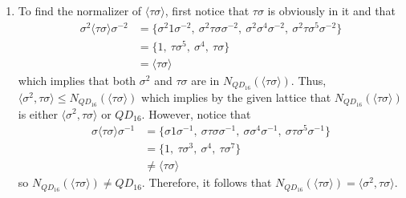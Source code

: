 \begin{solution}
    \begin{enumerate}[label = \textbf{(\alph*)}]
        \item To find the normalizer of $\langle \tau\sigma \rangle$, first notice that $\tau\sigma$ is obviously in it and that
        \begin{align*}
            \sigma^2\langle \tau\sigma \rangle \sigma^{-2} &= \{\sigma^2 1 \sigma^{-2}, \ \sigma^2 \tau\sigma \sigma^{-2}, \ \sigma^2 \sigma^4 \sigma^{-2}, \ \sigma^2 \tau\sigma^5 \sigma^{-2}\} \\
            &= \{1, \ \tau\sigma^5, \ \sigma^4, \ \tau\sigma\} \\
            &= \langle \tau\sigma \rangle
        \end{align*}
        which implies that both $\sigma^2$ and $\tau\sigma$ are in $N_{QD_{16}}(\langle \tau\sigma \rangle)$. Thus, $\langle \sigma^2, \tau\sigma \rangle \leq N_{QD_{16}}(\langle \tau\sigma \rangle)$ which implies by the given lattice that $N_{QD_{16}}(\langle \tau\sigma \rangle)$ is either $\langle \sigma^2, \tau\sigma \rangle$ or $QD_{16}$. However, notice that 
        \begin{align*}
            \sigma\langle \tau\sigma \rangle \sigma^{-1} &= \{\sigma 1 \sigma^{-1}, \ \sigma \tau\sigma \sigma^{-1}, \ \sigma \sigma^4 \sigma^{-1}, \ \sigma \tau\sigma^5 \sigma^{-1}\} \\
            &= \{1, \ \tau\sigma^3, \ \sigma^4, \ \tau\sigma^7\} \\
            &\neq \langle \tau\sigma \rangle
        \end{align*}
        so $N_{QD_{16}}(\langle \tau\sigma \rangle) \neq QD_{16}$. Therefore, it follows that $N_{QD_{16}}(\langle \tau\sigma \rangle) = \langle \sigma^2, \tau\sigma \rangle$.


\end{enumerate}
\end{solution}

